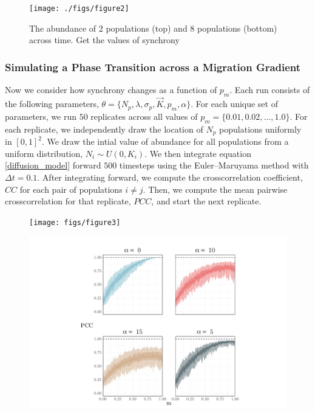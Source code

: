 \documentclass[]{article}
\begin{document}
\begin{figure}[h]
\texttt{[image: ./figs/figure2]}
\caption{The abundance of 2 populations (top) and 8 populations (bottom) across time. Get the values of synchrony }
\label{async_and_sync}

\end{figure}

\hypertarget{simulating-a-phase-transition-across-a-migration-gradient}{%
\subsubsection{Simulating a Phase Transition across a Migration
Gradient}\label{simulating-a-phase-transition-across-a-migration-gradient}}

Now we consider how synchrony changes as a function of \(p_m\). Each run
consists of the following parameters,
\(\theta = \{N_p, \lambda, \sigma_p, \vec{K},p_m, \alpha \}\). For each
unique set of parameters, we run \(50\) replicates across all values of
\(p_m = \{0.01,0.02,\dots,1.0 \}\). For each replicate, we independently
draw the location of \(N_p\)     populations uniformly in \([0,1]^2\). We
draw the intial value of abundance for all populations from a uniform
distribution, \(N_i \sim U(0, K_i)\). We then integrate equation
\ref{diffusion_model} forward \(500\) timesteps using the
Euler--Maruyama method with \(\Delta t=0.1\). After integrating forward,
we compute the crosscorrelation coefficient, \(CC\) for each pair of
populations \(i \neq j\). Then, we compute the mean pairwise
crosscorrelation for that replicate, \(PCC\), and start the next
replicate.



\pagebreak
\begin{figure}
    \texttt{[image: figs/figure3]}
    \caption{}
    \label{}
\end{figure}

\begin{figure}
    \includegraphics[width=15cm]{figs/figure4}
    \caption{}
    \label{}
\end{figure}
\end{document}
